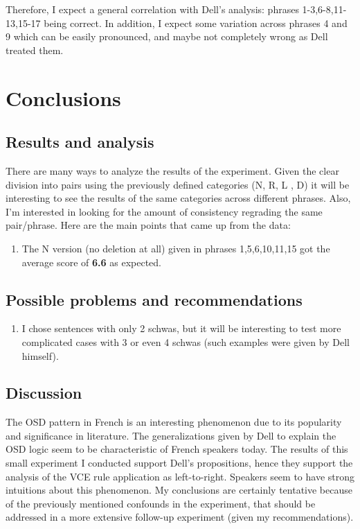 \documentclass{article}
\begin{document}
Therefore, I expect a general correlation with Dell's analysis: phrases 1-3,6-8,11-13,15-17 being correct. In addition, I expect some variation across phrases 4 and 9 which can be easily pronounced, and maybe not completely wrong as Dell treated them. 

\clearpage
\section{Conclusions}

\subsection{Results and analysis}
There are many ways to analyze the results of the experiment. Given the clear division into pairs using the previously defined categories (N, R, L , D) it will be interesting to see the results of the same categories across different phrases.  Also,  I'm interested in looking for the amount of consistency regrading the same pair/phrase.  Here are the main points that came up from the data:
\begin{enumerate}
  \item The N version (no deletion at all) given in phrases 1,5,6,10,11,15 got the average score of \textbf{6.6} as expected.
\end{enumerate}

\subsection{Possible problems and recommendations}
\begin{enumerate}
  \item I chose sentences with only 2 schwas, but it will be interesting to test more complicated cases with 3 or even 4 schwas (such examples were given by Dell himself).
\end{enumerate}

\subsection{Discussion}
The OSD pattern in French is an interesting phenomenon due to its popularity and significance in literature. The generalizations given by Dell to explain the OSD logic seem to be characteristic of French speakers today. The results of this small experiment I conducted support Dell's propositions, hence they support the analysis of the VCE rule application as left-to-right. Speakers seem to have strong intuitions about this phenomenon.
My conclusions are certainly tentative because of the previously mentioned confounds in the experiment,  that should be addressed in a more extensive follow-up experiment (given my recommendations).
\end{document}
